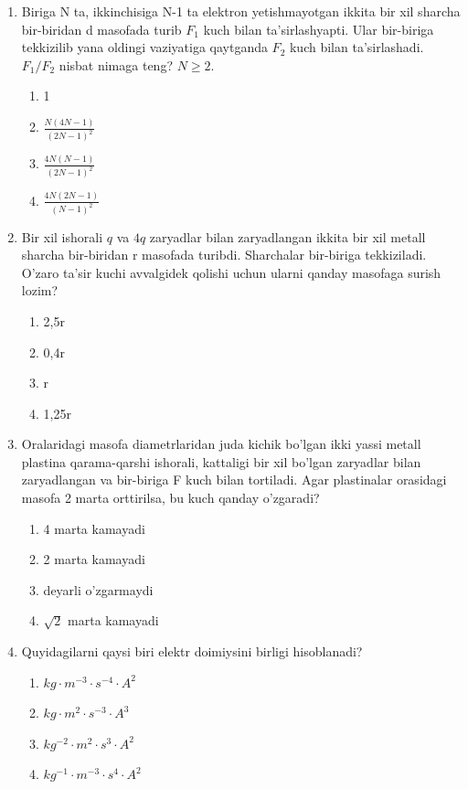 \begin{enumerate}
\item Biriga N ta, ikkinchisiga N-1 ta elektron yetishmayotgan ikkita bir xil sharcha bir-biridan d masofada turib $F_1$ kuch bilan ta'sirlashyapti. Ular bir-biriga tekkizilib yana oldingi vaziyatiga qaytganda $F_2$ kuch bilan ta'sirlashadi. $F_1/F_2$ nisbat nimaga teng? $N \ge 2$.
\begin{enumerate}[label=\Alph*)]
\item 1
\item $\frac{N(4N-1)}{(2N-1)^2}$
\item $\frac{4N(N-1)}{(2N-1)^2}$
\item $\frac{4N(2N-1)}{(N-1)^2}$
\end{enumerate}

\item Bir xil ishorali $q$ va $4q$ zaryadlar bilan zaryadlangan ikkita bir xil metall sharcha bir-biridan r masofada turibdi. Sharchalar bir-biriga tekkiziladi. O'zaro ta'sir kuchi avvalgidek qolishi uchun ularni qanday masofaga surish lozim?
\begin{enumerate}[label=\Alph*)]
\item 2,5r
\item 0,4r
\item r
\item 1,25r
\end{enumerate}

\item Oralaridagi masofa diametrlaridan juda kichik bo'lgan ikki yassi metall plastina qarama-qarshi ishorali, kattaligi bir xil bo'lgan zaryadlar bilan zaryadlangan va bir-biriga F kuch bilan tortiladi. Agar plastinalar orasidagi masofa 2 marta orttirilsa, bu kuch qanday o'zgaradi?
\begin{enumerate}[label=\Alph*)]
\item 4 marta kamayadi
\item 2 marta kamayadi
\item deyarli o'zgarmaydi
\item $\sqrt{2}$ marta kamayadi
\end{enumerate}

\item Quyidagilarni qaysi biri elektr doimiysini birligi hisoblanadi?
\begin{enumerate}[label=\Alph*)]
\item $kg \cdot m^{-3} \cdot s^{-4} \cdot A^2$
\item $kg \cdot m^2 \cdot s^{-3} \cdot A^3$
\item $kg^{-2} \cdot m^2 \cdot s^3 \cdot A^2$
\item $kg^{-1} \cdot m^{-3} \cdot s^4 \cdot A^2$
\end{enumerate}


\end{enumerate}
